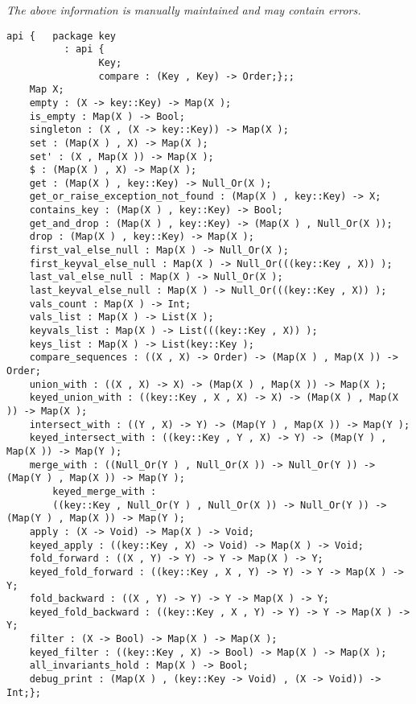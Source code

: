 \label{api:Map\_With\_Implicit\_Keys}

{\tiny \it The above information is manually maintained and may contain errors.}
\begin{verbatim}
api {   package key
          : api {
                Key;
                compare : (Key , Key) -> Order;};;
    Map X;
    empty : (X -> key::Key) -> Map(X );
    is_empty : Map(X ) -> Bool;
    singleton : (X , (X -> key::Key)) -> Map(X );
    set : (Map(X ) , X) -> Map(X );
    set' : (X , Map(X )) -> Map(X );
    $ : (Map(X ) , X) -> Map(X );
    get : (Map(X ) , key::Key) -> Null_Or(X );
    get_or_raise_exception_not_found : (Map(X ) , key::Key) -> X;
    contains_key : (Map(X ) , key::Key) -> Bool;
    get_and_drop : (Map(X ) , key::Key) -> (Map(X ) , Null_Or(X ));
    drop : (Map(X ) , key::Key) -> Map(X );
    first_val_else_null : Map(X ) -> Null_Or(X );
    first_keyval_else_null : Map(X ) -> Null_Or(((key::Key , X)) );
    last_val_else_null : Map(X ) -> Null_Or(X );
    last_keyval_else_null : Map(X ) -> Null_Or(((key::Key , X)) );
    vals_count : Map(X ) -> Int;
    vals_list : Map(X ) -> List(X );
    keyvals_list : Map(X ) -> List(((key::Key , X)) );
    keys_list : Map(X ) -> List(key::Key );
    compare_sequences : ((X , X) -> Order) -> (Map(X ) , Map(X )) -> Order;
    union_with : ((X , X) -> X) -> (Map(X ) , Map(X )) -> Map(X );
    keyed_union_with : ((key::Key , X , X) -> X) -> (Map(X ) , Map(X )) -> Map(X );
    intersect_with : ((Y , X) -> Y) -> (Map(Y ) , Map(X )) -> Map(Y );
    keyed_intersect_with : ((key::Key , Y , X) -> Y) -> (Map(Y ) , Map(X )) -> Map(Y );
    merge_with : ((Null_Or(Y ) , Null_Or(X )) -> Null_Or(Y )) -> (Map(Y ) , Map(X )) -> Map(Y );
        keyed_merge_with :
        ((key::Key , Null_Or(Y ) , Null_Or(X )) -> Null_Or(Y )) -> (Map(Y ) , Map(X )) -> Map(Y );
    apply : (X -> Void) -> Map(X ) -> Void;
    keyed_apply : ((key::Key , X) -> Void) -> Map(X ) -> Void;
    fold_forward : ((X , Y) -> Y) -> Y -> Map(X ) -> Y;
    keyed_fold_forward : ((key::Key , X , Y) -> Y) -> Y -> Map(X ) -> Y;
    fold_backward : ((X , Y) -> Y) -> Y -> Map(X ) -> Y;
    keyed_fold_backward : ((key::Key , X , Y) -> Y) -> Y -> Map(X ) -> Y;
    filter : (X -> Bool) -> Map(X ) -> Map(X );
    keyed_filter : ((key::Key , X) -> Bool) -> Map(X ) -> Map(X );
    all_invariants_hold : Map(X ) -> Bool;
    debug_print : (Map(X ) , (key::Key -> Void) , (X -> Void)) -> Int;};
\end{verbatim}
